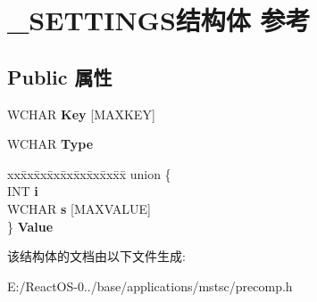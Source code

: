 \hypertarget{struct___s_e_t_t_i_n_g_s}{}\section{\+\_\+\+S\+E\+T\+T\+I\+N\+G\+S结构体 参考}
\label{struct___s_e_t_t_i_n_g_s}
\subsection*{Public 属性}
\begin{DoxyCompactItemize}
\item 
\mbox{\label{struct___s_e_t_t_i_n_g_s_a58ed71bf010d806f092829db7e2aaad3}} 
W\+C\+H\+AR {\bfseries Key} \mbox{[}M\+A\+X\+K\+EY\mbox{]}
\item 
\mbox{\label{struct___s_e_t_t_i_n_g_s_a4a1441675ad3e6a94dcbc780cb00f46c}} 
W\+C\+H\+AR {\bfseries Type}
\item 
\mbox{\label{struct___s_e_t_t_i_n_g_s_a609955b4bf82c5c778c0e960904de6e1}} 
\begin{tabbing}
xx\=xx\=xx\=xx\=xx\=xx\=xx\=xx\=xx\=\kill
union \{\\
\>INT {\bfseries i}\\
\>WCHAR {\bfseries s} \mbox{[}MAXVALUE\mbox{]}\\
\} {\bfseries Value}\\

\end{tabbing}\end{DoxyCompactItemize}


该结构体的文档由以下文件生成\+:\begin{DoxyCompactItemize}
\item 
E\+:/\+React\+O\+S-\/0../base/applications/mstsc/precomp.\+h\end{DoxyCompactItemize}
